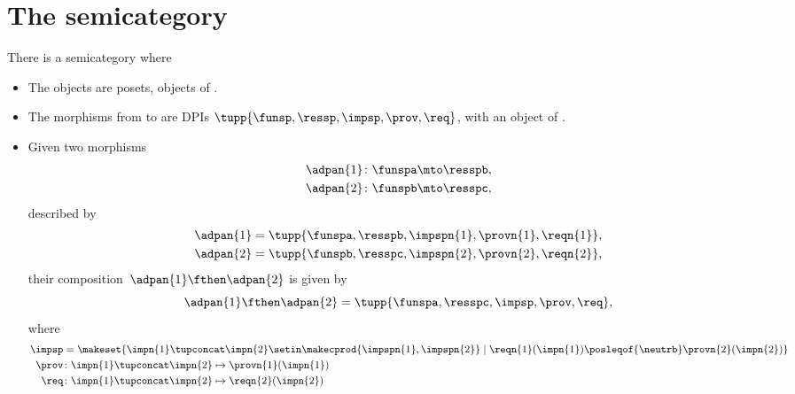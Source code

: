 \section{The semicategory \DPI}
\label{sec:DPI-semicat}


\begin{definition}
    \label{def:DPIcat}
    There is a semicategory \DPI where
    \begin{itemize}
        \item The objects are posets, objects of \PosL.
        \item The morphisms from \funsp to \ressp are DPIs $\tupp{\funsp,\ressp,\impsp,\prov,\req}$, with \impsp an object of \SetL.
        \item Given two morphisms
              \begin{align}
                  \adpan{1} & \colon \funspa \mto \resspb, \\
                  \adpan{2} & \colon \funspb \mto \resspc,
              \end{align}
              described by
              \begin{align}
                  \adpan{1} & = \tupp{\funspa,\resspb,\impspn{1},\provn{1},\reqn{1}}, \\
                  \adpan{2} & = \tupp{\funspb,\resspc,\impspn{2},\provn{2},\reqn{2}},
              \end{align}
              their composition~$\adpan{1} \fthen \adpan{2}$ is given by
              \begin{equation}
                  \adpan{1} \fthen \adpan{2} = \tupp{\funspa,\resspc,\impsp,\prov,\req},
              \end{equation}
              where
              \begin{align}
                  \impsp & = \makeset{ \impn{1} \tupconcat \impn{2} \setin \makecprod{\impspn{1}, \impspn{2}} \mid \reqn{1}(\impn{1}) \posleqof{\neutrb} \provn{2}(\impn{2})} \\
                  \prov  & \colon \impn{1} \tupconcat \impn{2} \mapsto \provn{1}(\impn{1}) \\
                  \req   & \colon \impn{1} \tupconcat \impn{2} \mapsto \reqn{2}(\impn{2})
              \end{align}
    \end{itemize}
\end{definition}

